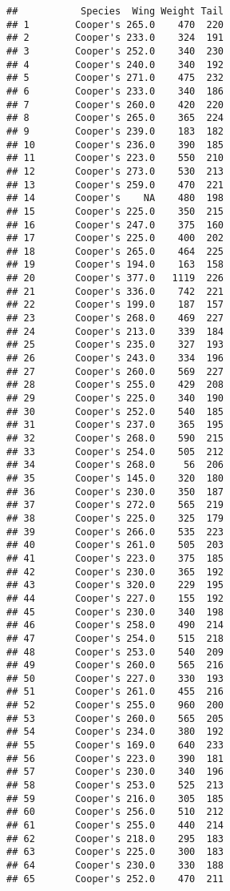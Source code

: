\documentclass[
]{article}
\begin{document}
\begin{verbatim}
##           Species  Wing Weight Tail
## 1        Cooper's 265.0    470  220
## 2        Cooper's 233.0    324  191
## 3        Cooper's 252.0    340  230
## 4        Cooper's 240.0    340  192
## 5        Cooper's 271.0    475  232
## 6        Cooper's 233.0    340  186
## 7        Cooper's 260.0    420  220
## 8        Cooper's 265.0    365  224
## 9        Cooper's 239.0    183  182
## 10       Cooper's 236.0    390  185
## 11       Cooper's 223.0    550  210
## 12       Cooper's 273.0    530  213
## 13       Cooper's 259.0    470  221
## 14       Cooper's    NA    480  198
## 15       Cooper's 225.0    350  215
## 16       Cooper's 247.0    375  160
## 17       Cooper's 225.0    400  202
## 18       Cooper's 265.0    464  225
## 19       Cooper's 194.0    163  158
## 20       Cooper's 377.0   1119  226
## 21       Cooper's 336.0    742  221
## 22       Cooper's 199.0    187  157
## 23       Cooper's 268.0    469  227
## 24       Cooper's 213.0    339  184
## 25       Cooper's 235.0    327  193
## 26       Cooper's 243.0    334  196
## 27       Cooper's 260.0    569  227
## 28       Cooper's 255.0    429  208
## 29       Cooper's 225.0    340  190
## 30       Cooper's 252.0    540  185
## 31       Cooper's 237.0    365  195
## 32       Cooper's 268.0    590  215
## 33       Cooper's 254.0    505  212
## 34       Cooper's 268.0     56  206
## 35       Cooper's 145.0    320  180
## 36       Cooper's 230.0    350  187
## 37       Cooper's 272.0    565  219
## 38       Cooper's 225.0    325  179
## 39       Cooper's 266.0    535  223
## 40       Cooper's 261.0    505  203
## 41       Cooper's 223.0    375  185
## 42       Cooper's 230.0    365  192
## 43       Cooper's 320.0    229  195
## 44       Cooper's 227.0    155  192
## 45       Cooper's 230.0    340  198
## 46       Cooper's 258.0    490  214
## 47       Cooper's 254.0    515  218
## 48       Cooper's 253.0    540  209
## 49       Cooper's 260.0    565  216
## 50       Cooper's 227.0    330  193
## 51       Cooper's 261.0    455  216
## 52       Cooper's 255.0    960  200
## 53       Cooper's 260.0    565  205
## 54       Cooper's 234.0    380  192
## 55       Cooper's 169.0    640  233
## 56       Cooper's 223.0    390  181
## 57       Cooper's 230.0    340  196
## 58       Cooper's 253.0    525  213
## 59       Cooper's 216.0    305  185
## 60       Cooper's 256.0    510  212
## 61       Cooper's 255.0    440  214
## 62       Cooper's 218.0    295  183
## 63       Cooper's 225.0    300  183
## 64       Cooper's 230.0    330  188
## 65       Cooper's 252.0    470  211

\end{verbatim}
\end{document}
